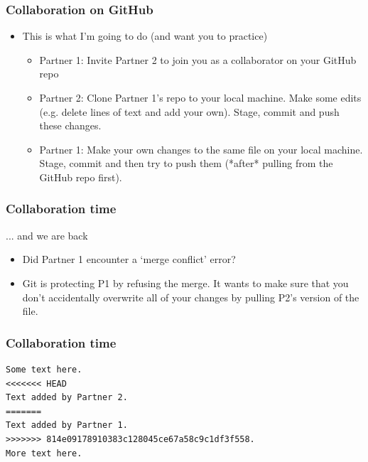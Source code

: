 \documentclass[
  shownotes,
  xcolor={svgnames},
  hyperref={colorlinks,citecolor=DarkBlue,linkcolor=andesred,urlcolor=DarkBlue}
  , aspectratio=169]{beamer}
\begin{document}
\begin{frame}[fragile]
\frametitle{Collaboration on GitHub}

\begin{itemize}

\item This is what I'm going to do (and want you to practice)

\medskip

  \begin{itemize}

    \item Partner 1: Invite Partner 2 to join you as a collaborator on your GitHub repo 
    \medskip
    \item Partner 2: Clone Partner 1's repo to your local machine. Make some edits (e.g. delete lines of text and add your own). Stage, commit and push these changes.
    \medskip
    \item Partner 1: Make your own changes to the same file on your local machine. Stage, commit and then try to push them (*after* pulling from the GitHub repo first).

  \end{itemize}


\end{itemize}
\end{frame}

\begin{frame}[fragile]
\frametitle{Collaboration time}
... and we are back
\bigskip
\begin{itemize}
  \item Did Partner 1 encounter a `merge conflict' error? 


\bigskip
\item Git is protecting P1 by refusing the merge. It wants to make sure that you don't accidentally overwrite all of your changes by pulling P2's version of the file.



\end{itemize}
\end{frame}

\begin{frame}[fragile]
\frametitle{Collaboration time}


\begin{verbatim}
Some text here.
<<<<<<< HEAD
Text added by Partner 2.
=======
Text added by Partner 1.
>>>>>>> 814e09178910383c128045ce67a58c9c1df3f558.
More text here.
\end{verbatim}

\end{frame}
\end{document}
